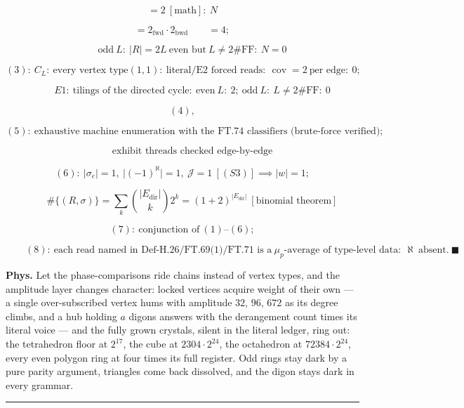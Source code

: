 \begin{theorem}
\[
= 2\ [\text{math}]:\ N
\]

\[
= 2_{\mathrm{fwd}}\cdot2_{\mathrm{bwd}}\qquad = 4;
\]

\[
\qquad \text{odd}\ L:\ |R|=2L\ \text{even but}\ L\ne2\#\mathrm{FF}:\ N=0
\]

\[
(3):\ C_L:\ \text{every vertex type}(1,1):\ \text{literal/E2 forced reads}:\ \operatorname{cov}=2\ \text{per edge}:\ 0;
\]

\[
\qquad E1:\ \text{tilings of the directed cycle}:\ \text{even}\ L:\ 2;\ \text{odd}\ L:\ L\ne2\#\mathrm{FF}:\ 0
\]

\[
(4),
\]

\[
(5):\ \text{exhaustive machine enumeration with the FT.74 classifiers (brute-force verified)};
\]

\[
\qquad \text{exhibit threads checked edge-by-edge}
\]

\[
(6):\ |\sigma_e|=1,\ \bigl|(-1)^{\aleph}\bigr|=1,\ \mathcal J=1\ [(S3)]\implies|w|=1;
\]

\[
\qquad \#\{(R,\sigma)\}=\textstyle\sum_k\binom{|E_{\mathrm{dir}}|}k2^{k}=(1+2)^{|E_{\mathrm{dir}}|}\ [\text{binomial theorem}]
\]

\[
(7):\ \text{conjunction of}\ (1)\text{–}(6);
\]

\[
\qquad (8):\ \text{each read named in Def-H.26/FT.69(1)/FT.71 is a}\ \mu_p\text{-average of type-level data}:\ \aleph\ \text{absent}.\ \blacksquare
\]

\textbf{Phys.} Let the phase-comparisons ride chains instead of vertex types, and the amplitude layer changes character: locked vertices acquire weight of their own — a single over-subscribed vertex hums with amplitude $32$, $96$, $672$ as its degree climbs, and a hub holding $a$ digons answers with the derangement count times its literal voice — and the fully grown crystals, silent in the literal ledger, ring out: the tetrahedron floor at $2^{17}$, the cube at $2304\cdot2^{24}$, the octahedron at $72384\cdot2^{24}$, every even polygon ring at four times its full register. Odd rings stay dark by a pure parity argument, triangles come back dissolved, and the digon stays dark in every grammar.

\vspace{2pt}\noindent\rule{\textwidth}{0.4pt}\vspace{2pt}

\end{theorem}

